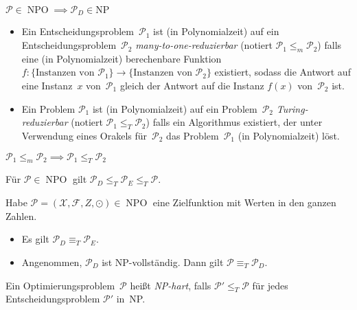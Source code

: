 \documentclass{cheat-sheet}
\newcommand{\Instances}{\mathcal{X}} %
\newcommand{\Feasible}{\mathcal{F}} %
\newcommand{\ObjFun}{Z} %
\newcommand{\Goal}{\odot} %
\newcommand{\OptTuple}{(\Instances{}, \Feasible{}, \ObjFun{}, \Goal)} %
\DeclareMathOperator{\NPO}{NPO} %
\newcommand{\Prob}{\mathcal{P}} %
\newcommand{\ManyOneRed}{\leq_m} %
\newcommand{\TuringRed}{\leq_T} %
\newcommand{\TuringEq}{\equiv_T} %
\begin{document}
\begin{lem}
  $\Prob \in \NPO \implies \Prob_D \in \mathrm{NP}$
\end{lem}

\begin{defn}
  \begin{itemize}
    \item Ein Entscheidungsproblem~$\Prob_1$ ist (in Polynomialzeit) auf ein Entscheidungsproblem~$\Prob_2$ \emph{many-to-one-reduzierbar} (notiert $\Prob_1 \ManyOneRed \Prob_2$) falls eine (in Polynomialzeit) berechenbare Funktion $f : \{ \text{Instanzen von~$\Prob_1$} \} \to \{ \text{Instanzen von~$\Prob_2$} \}$ existiert, sodass die Antwort auf eine Instanz~$x$ von~$\Prob_1$ gleich der Antwort auf die Instanz $f(x)$ von~$\Prob_2$ ist.
    \item Ein Problem $\Prob_1$ ist (in Polynomialzeit) auf ein Problem~$\Prob_2$ \emph{Turing-reduzierbar} (notiert $\Prob_1 \TuringRed \Prob_2$) falls ein Algorithmus existiert, der unter Verwendung eines Orakels für~$\Prob_2$ das Problem~$\Prob_1$ (in Polynomialzeit) löst.
  \end{itemize}
\end{defn}

\begin{beob}
  $
    \Prob_1 \ManyOneRed \Prob_2 \implies
    \Prob_1 \TuringRed \Prob_2
  $
\end{beob}

\begin{beob}
  Für $\Prob \in \NPO$ gilt $\Prob_D \TuringRed \Prob_E \TuringRed \Prob$.
\end{beob}

\begin{satz}
  Habe $\Prob = \OptTuple \in \NPO$ eine Zielfunktion mit Werten in den ganzen Zahlen.
  \begin{itemize}
    \item Es gilt $\Prob_D \TuringEq \Prob_E$.
    \item Angenommen, $\Prob_D$ ist NP-vollständig. Dann gilt $\Prob \TuringEq \Prob_D$.
  \end{itemize}
\end{satz}

\begin{defn}
  Ein Optimierungsproblem~$\Prob$ heißt \emph{NP-hart}, falls $\Prob' \TuringRed \Prob$ für jedes Entscheidungsproblem $\Prob'$ in~NP.
\end{defn}
\end{document}
